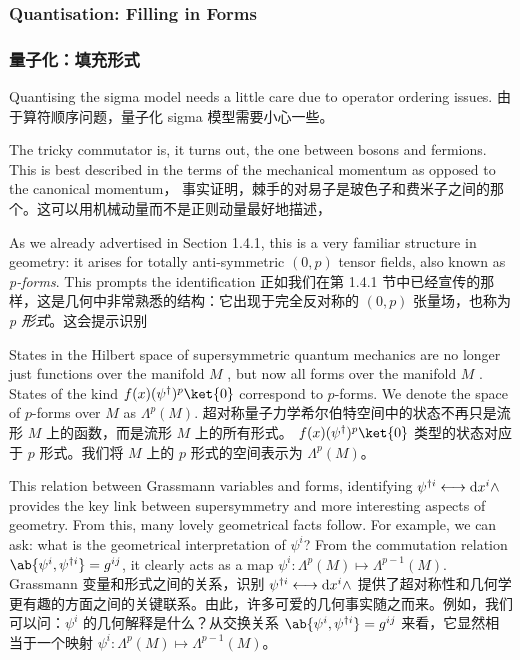\documentclass{article}
\begin{document}
\begin{paracol}{2}
\subsubsection{Quantisation: Filling in Forms}
\switchcolumn
\subsubsection*{量子化：填充形式}
\switchcolumn*

Quantising the sigma model needs a little care due to operator ordering issues.
\switchcolumn
由于算符顺序问题，量子化 sigma 模型需要小心一些。
\switchcolumn*

The tricky commutator is, it turns out, the one between bosons and fermions. This is best described in the terms of the mechanical momentum as opposed to the canonical momentum，
\switchcolumn
事实证明，棘手的对易子是玻色子和费米子之间的那个。这可以用机械动量而不是正则动量最好地描述，
\switchcolumn*

As we already advertised in Section 1.4.1, this is a very familiar structure in geometry: it arises for totally anti-symmetric $(0, p)$ tensor ﬁelds, also known as \textit{p-forms}. This prompts the identiﬁcation
\switchcolumn
正如我们在第 1.4.1 节中已经宣传的那样，这是几何中非常熟悉的结构：它出现于完全反对称的 $(0, p)$ 张量场，也称为 \textit{p 形式}。这会提示识别
\switchcolumn*

States in the Hilbert space of supersymmetric quantum mechanics are no longer just functions over the manifold $M$ , but now all forms over the manifold $M$ . States of the kind $f(x) (\psi^{\dagger})^{p} \ket{0}$ correspond to $p$-forms. We denote the space of $p$-forms over $M$ as $\Lambda^{p}(M)$.
\switchcolumn
超对称量子力学希尔伯特空间中的状态不再只是流形 $M$ 上的函数，而是流形 $M$ 上的所有形式。 $f(x) (\psi^{\dagger})^{p} \ket{0}$ 类型的状态对应于 $p$ 形式。我们将 $M$ 上的 $p$ 形式的空间表示为 $\Lambda^{p}(M)$。
\switchcolumn*

This relation between Grassmann variables and forms, identifying $\psi^{\dagger i} \longleftrightarrow \odif{x}^i \wedge$ provides the key link between supersymmetry and more interesting aspects of geometry. From this, many lovely geometrical facts follow. For example, we can ask: what is the geometrical interpretation of $\psi^i$? From the commutation relation $\ab\{\psi^i, \psi^{\dagger i}\} = g^{ij}$, it clearly acts as a map $\psi^{i}: \Lambda^p(M) \mapsto \Lambda^{p - 1}(M)$.
\switchcolumn
Grassmann 变量和形式之间的关系，识别 $\psi^{\dagger i} \longleftrightarrow \odif{x}^i \wedge$ 提供了超对称性和几何学更有趣的方面之间的关键联系。由此，许多可爱的几何事实随之而来。例如，我们可以问：$\psi^i$ 的几何解释是什么？从交换关系 $\ab\{\psi^i, \psi^{\dagger i}\} = g^{ij}$ 来看，它显然相当于一个映射 $\psi^{i}: \Lambda^p (M) \mapsto \Lambda^{p - 1}(M)$。
\switchcolumn*


\end{paracol}
\end{document}
